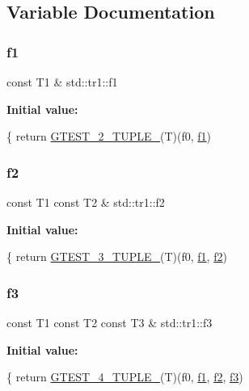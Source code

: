 \subsection{Variable Documentation}
\mbox{\label{namespacestd_1_1tr1_a9c0fa65b105f8e2f58ba59ecf75fd000}} 
\subsubsection{\texorpdfstring{f1}{f1}}
{\footnotesize\ttfamily const T1 \& std\+::tr1\+::f1}

{\bfseries Initial value\+:}
\begin{DoxyCode}
\{
  \textcolor{keywordflow}{return} \hyperlink{gtest-tuple_8h_a93229c3f009273c73eca237b4d19f326}{GTEST\_2\_TUPLE\_}(T)(f0, \hyperlink{namespacestd_1_1tr1_a9c0fa65b105f8e2f58ba59ecf75fd000}{f1})
\end{DoxyCode}
\mbox{\label{namespacestd_1_1tr1_a87dd9e009868361317f587126dba63d4}} 
\subsubsection{\texorpdfstring{f2}{f2}}
{\footnotesize\ttfamily const T1 const T2 \& std\+::tr1\+::f2}

{\bfseries Initial value\+:}
\begin{DoxyCode}
\{
  \textcolor{keywordflow}{return} \hyperlink{gtest-tuple_8h_af2c3eab3f1a5197b408fce44eb3ed9da}{GTEST\_3\_TUPLE\_}(T)(f0, \hyperlink{namespacestd_1_1tr1_a9c0fa65b105f8e2f58ba59ecf75fd000}{f1}, \hyperlink{namespacestd_1_1tr1_a87dd9e009868361317f587126dba63d4}{f2})
\end{DoxyCode}
\mbox{\label{namespacestd_1_1tr1_a0f7c3b47d27d42d82d1a333ea420ce4e}} 
\subsubsection{\texorpdfstring{f3}{f3}}
{\footnotesize\ttfamily const T1 const T2 const T3 \& std\+::tr1\+::f3}

{\bfseries Initial value\+:}
\begin{DoxyCode}
\{
  \textcolor{keywordflow}{return} \hyperlink{gtest-tuple_8h_a3625feb24d5e6eb9926fd558e4a2e3ff}{GTEST\_4\_TUPLE\_}(T)(f0, \hyperlink{namespacestd_1_1tr1_a9c0fa65b105f8e2f58ba59ecf75fd000}{f1}, \hyperlink{namespacestd_1_1tr1_a87dd9e009868361317f587126dba63d4}{f2}, \hyperlink{namespacestd_1_1tr1_a0f7c3b47d27d42d82d1a333ea420ce4e}{f3})
\end{DoxyCode}
\mbox{\label{namespacestd_1_1tr1_adc796e02b7385d526aff708189564f67}} 
